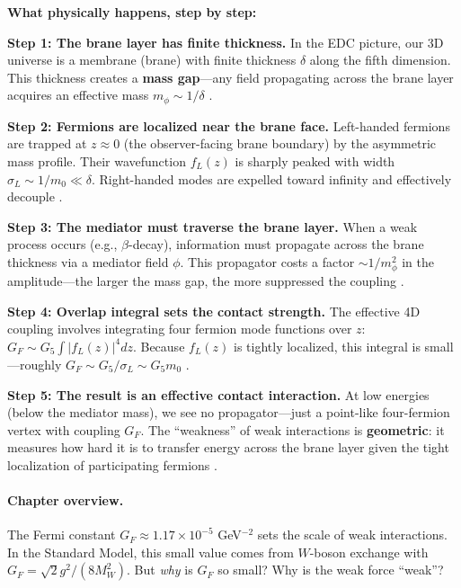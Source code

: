 \begin{tcolorbox}[colback=green!5!white, colframe=green!50!black,
    title=\textbf{The Fermi Constant in EDC: Physical Process}]
\textbf{What physically happens, step by step:}

\textbf{Step 1: The brane layer has finite thickness.}
In the EDC picture, our 3D universe is a membrane (brane) with finite thickness $\delta$
along the fifth dimension. This thickness creates a \textbf{mass gap}---any field
propagating across the brane layer acquires an effective mass $m_\phi \sim 1/\delta$ \tagP{}.

\textbf{Step 2: Fermions are localized near the brane face.}
Left-handed fermions are trapped at $z \approx 0$ (the observer-facing brane boundary)
by the asymmetric mass profile. Their wavefunction $f_L(z)$ is sharply peaked with
width $\sigma_L \sim 1/m_0 \ll \delta$. Right-handed modes are expelled toward
infinity and effectively decouple \tagDc{}.

\textbf{Step 3: The mediator must traverse the brane layer.}
When a weak process occurs (e.g., $\beta$-decay), information must propagate across
the brane thickness via a mediator field $\phi$. This propagator costs a factor
$\sim 1/m_\phi^2$ in the amplitude---the larger the mass gap, the more suppressed
the coupling \tagDc{}.

\textbf{Step 4: Overlap integral sets the contact strength.}
The effective 4D coupling involves integrating four fermion mode functions over $z$:
$G_F \sim G_5 \int |f_L(z)|^4 dz$. Because $f_L(z)$ is tightly localized, this
integral is small---roughly $G_F \sim G_5 / \sigma_L \sim G_5 m_0$ \tagP{}.

\textbf{Step 5: The result is an effective contact interaction.}
At low energies (below the mediator mass), we see no propagator---just a point-like
four-fermion vertex with coupling $G_F$. The ``weakness'' of weak interactions is
\textbf{geometric}: it measures how hard it is to transfer energy across the
brane layer given the tight localization of participating fermions \tagI{}.
\end{tcolorbox}


\paragraph{Chapter overview.}
The Fermi constant $G_F \approx 1.17 \times 10^{-5}$ GeV$^{-2}$ sets the scale of
weak interactions. In the Standard Model, this small value comes from $W$-boson
exchange with $G_F = \sqrt{2}g^2/(8M_W^2)$. But \emph{why} is $G_F$ so small?
Why is the weak force ``weak''?

